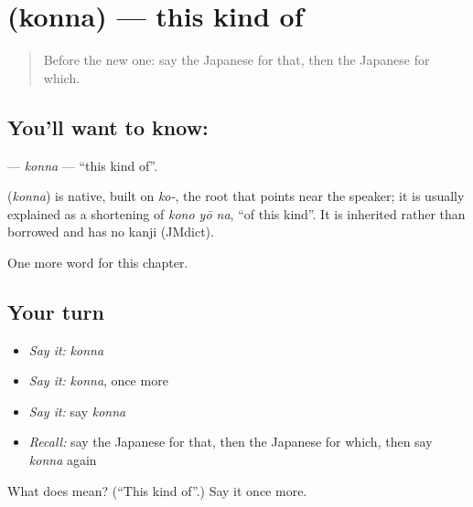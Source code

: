 \section[\texorpdfstring{\ja{こんな} (konna)}{こんな (konna)}]{ (konna) — this kind of}

\label{lesson:JA-C83-konna}



\begin{quote}
Before the new one: say the Japanese for that, then the Japanese for which.
\end{quote}

\subsection*{You'll want to know: }
\textbf{} — \emph{konna} — \textquotedblleft{}this kind of\textquotedblright{}.

\begin{cousinweb}
\textbf{} (\emph{konna}) is native, built on \emph{ko-}, the root that points near the speaker; it is usually explained as a shortening of \emph{kono yō na}, \textquotedblleft{}of this kind\textquotedblright{}. It is inherited rather than borrowed and has no kanji (JMdict).
\end{cousinweb}

\begin{grammarlens}[title={What you've built}]
One more word for this chapter.
\end{grammarlens}

\subsection*{Your turn}
\begin{itemize}
\raggedright
  \item \emph{Say it:} \emph{konna}
  \item \emph{Say it:} \emph{konna}, once more
  \item \emph{Say it:} say \emph{konna}
  \item \emph{Recall:} say the Japanese for that, then the Japanese for which, then say \emph{konna} again
\end{itemize}

\begin{tcolorbox}[breakable,colback=teal!4,colframe=teal!35!black,title={Before you move on}]
What does  mean? (\textquotedblleft{}This kind of\textquotedblright{}.) Say it once more.
\end{tcolorbox}
